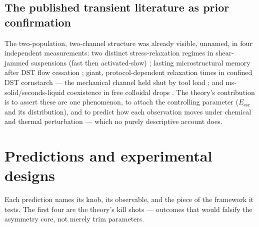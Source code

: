 \documentclass[11pt]{article}
\begin{document}
\subsection{The published transient literature as prior confirmation}
The two-population, two-channel structure was already visible, unnamed, in four independent measurements: two distinct stress-relaxation regimes in shear-jammed suspensions (fast then activated-slow) \cite{barik2022}; lasting microstructural memory after DST flow cessation \cite{cho2022}; giant, protocol-dependent relaxation times in confined DST cornstarch --- the mechanical channel held shut by tool load \cite{maharjan2017}; and ms-solid/seconds-liquid coexistence in free colloidal drops \cite{shah2022}. The theory's contribution is to assert these are one phenomenon, to attach the controlling parameter ($E_{\mathrm{esc}}$ and its distribution), and to predict how each observation moves under chemical and thermal perturbation --- which no purely descriptive account does.

\section{Predictions and experimental designs}
\label{sec:predictions}

Each prediction names its knob, its observable, and the piece of the framework it tests. The first four are the theory's kill shots --- outcomes that would falsify the asymmetry core, not merely trim parameters.
\end{document}
